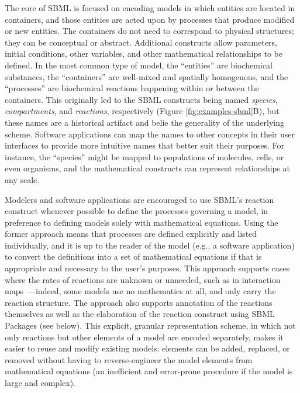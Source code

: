 \documentclass[]{draft-sbml-paper}
\begin{document}
The core of SBML is focused on encoding models in which entities are located in containers, and those entities are acted upon by processes that produce modified or new entities.  The containers do not need to correspond to physical structures; they can be conceptual or abstract.  Additional constructs allow parameters, initial conditions, other variables, and other mathematical relationships to be defined.  In the most common type of model, the ``entities'' are biochemical substances, the ``containers'' are well-mixed and spatially homogenous, and the ``processes'' are biochemical reactions happening within or between the containers.  This originally led to the SBML constructs being named \emph{species}, \emph{compartments}, and \emph{reactions}, respectively (Figure \ref{fig:examples-sbml}B), but these names are a historical artifact and belie the generality of the underlying scheme.  Software applications can map the names to other concepts in their user interfaces to provide more intuitive names that better suit their purposes.  For instance, the ``species'' might be mapped to populations of molecules, cells, or even organisms, and the mathematical constructs can represent relationships at any scale.

Modelers and software applications are encouraged to use SBML's reaction construct whenever possible to define the processes governing a model, in preference to defining models solely with mathematical equations.  Using the former approach means that processes are defined explicitly and listed individually, and it is up to the reader of the model (e.g., a software application) to convert the definitions into a set of mathematical equations if that is appropriate and necessary to the user's purposes.  This approach supports cases where the rates of reactions are unknown or unneeded, such as in interaction maps~\citep[e.g.,][]{oda2005comprehensive}---indeed, some models use no mathematics at all, and only carry the reaction structure.  The approach also supports annotation of the reactions themselves as well as the elaboration of the reaction construct using SBML Packages (see below).  This explicit, granular representation scheme, in which not only reactions but other elements of a model are encoded separately, makes it easier to reuse and modify existing models: elements can be added, replaced, or removed without having to reverse-engineer the model elements from mathematical equations (an inefficient and error-prone procedure if the model is large and complex).

\end{document}
